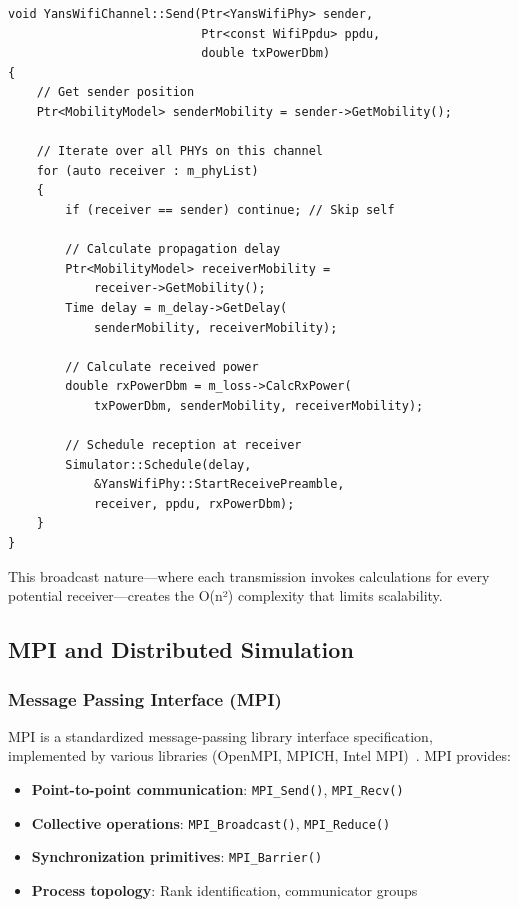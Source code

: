 \begin{lstlisting}[style=cpp, caption={YansWifiChannel transmission logic (simplified)}]
void YansWifiChannel::Send(Ptr<YansWifiPhy> sender,
                           Ptr<const WifiPpdu> ppdu,
                           double txPowerDbm)
{
    // Get sender position
    Ptr<MobilityModel> senderMobility = sender->GetMobility();
    
    // Iterate over all PHYs on this channel
    for (auto receiver : m_phyList)
    {
        if (receiver == sender) continue; // Skip self
        
        // Calculate propagation delay
        Ptr<MobilityModel> receiverMobility = 
            receiver->GetMobility();
        Time delay = m_delay->GetDelay(
            senderMobility, receiverMobility);
        
        // Calculate received power
        double rxPowerDbm = m_loss->CalcRxPower(
            txPowerDbm, senderMobility, receiverMobility);
        
        // Schedule reception at receiver
        Simulator::Schedule(delay, 
            &YansWifiPhy::StartReceivePreamble,
            receiver, ppdu, rxPowerDbm);
    }
}
\end{lstlisting}

This broadcast nature—where each transmission invokes calculations for every potential receiver—creates the O(n²) complexity that limits scalability.

\subsection{MPI and Distributed Simulation}

\subsubsection{Message Passing Interface (MPI)}

MPI is a standardized message-passing library interface specification, implemented by various libraries (OpenMPI, MPICH, Intel MPI)~\cite{mpi-standard}. MPI provides:

\begin{itemize}
    \item \textbf{Point-to-point communication}: \texttt{MPI\_Send()}, \texttt{MPI\_Recv()}
    \item \textbf{Collective operations}: \texttt{MPI\_Broadcast()}, \texttt{MPI\_Reduce()}
    \item \textbf{Synchronization primitives}: \texttt{MPI\_Barrier()}
    \item \textbf{Process topology}: Rank identification, communicator groups
\end{itemize}


